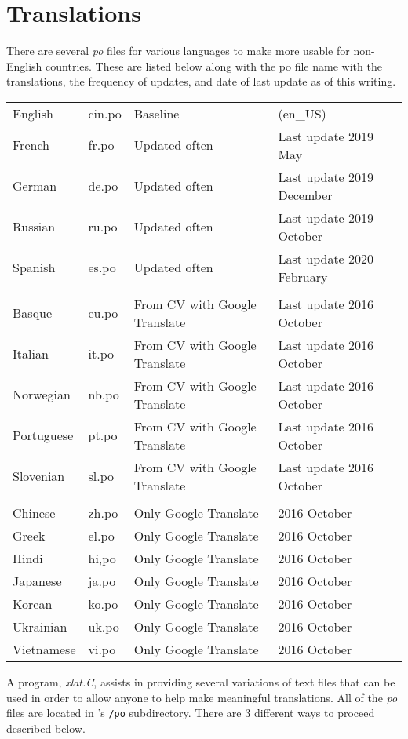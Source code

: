 \chapter{Translations}%
\label{cha:translations}

There are several \textit{po} files for various languages to make \CGG{} more usable for non-English 
countries.  These are listed below along with the po file name with the translations, the frequency
of updates, and date of last update as of this writing.

\begin{tabular}{llll}
\hline
	English& cin.po& Baseline &(en\_US) \\
	French&	fr.po&	Updated often& Last update 2019 May\\
	German&  de.po&	Updated often& Last update 2019 December\\
	Russian& ru.po&	Updated often& Last update 2019 October\\
	Spanish& es.po& Updated often& Last update 2020 February\\
\\
	Basque& eu.po&	From CV with Google Translate & Last update 2016 October\\
	Italian&it.po&	From CV with Google Translate & Last update 2016 October\\
	Norwegian& nb.po& From CV with Google Translate & Last update 2016 October\\ 
	Portuguese& pt.po& From CV with Google Translate& Last update 2016 October \\
	Slovenian& sl.po & From CV with Google Translate& Last update 2016 October \\
\\
	Chinese& zh.po&	Only Google Translate & 2016 October\\
	Greek&	el.po& Only Google Translate & 2016 October\\
	Hindi& hi,po& Only Google Translate & 2016 October\\
	Japanese& ja.po& Only Google Translate & 2016 October \\
	Korean& ko.po& Only Google Translate	& 2016 October \\
	Ukrainian& uk.po & Only Google Translate & 2016 October \\
	Vietnamese& vi.po& Only Google Translate & 2016 October \\
\hline
\end{tabular}

A program, \textit{xlat.C}, assists in providing several variations of text files that can be used in order to allow anyone to help make meaningful translations.  All of the \textit{po} files are located in \CGG{}’s \texttt{/po} subdirectory. There are 3 different ways to proceed described below.

